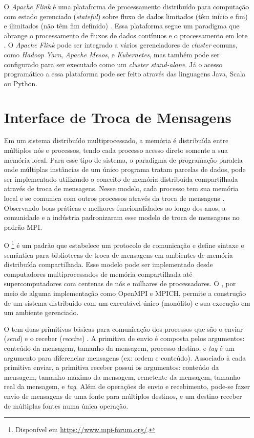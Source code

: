 O \emph{Apache Flink} é uma plataforma de processamento distribuído para
computação com estado gerenciado (\emph{stateful}) sobre fluxo de dados limitados (têm início e
fim) e ilimitados (não têm fim definido) \cite{ApacheFlink2020}.
Essa plataforma segue um paradigma que abrange o processamento de fluxos de
dados contínuos e o processamento em lote \cite{Carbone2015,Lopez2018}.
O \emph{Apache Flink} pode ser integrado a vários gerenciadores de \emph{cluster}
comuns, como \emph{Hadoop Yarn}, \emph{Apache Mesos}, e \emph{Kubernetes}, mas também pode ser
configurado para ser executado como um \emph{cluster stand-alone}.
Já o acesso programático a essa plataforma pode ser feito através das linguagens
Java, Scala ou Python.

\section{Interface de Troca de Mensagens}

Em um sistema distribuído multiprocessado, a memória é distribuída entre
múltiplos nós e processos, tendo cada processo acesso direto somente a sua memória
local.
Para esse tipo de sistema, o paradigma de programação paralela \spmd onde
múltiplas instâncias de um único programa tratam parcelas de dados, pode ser
implementado utilizando o conceito de memória distribuída compartilhada através
de troca de mensagens.
Nesse modelo, cada
processo tem sua memória local e se comunica com outros processos através da
troca de mensagens \cite{mpi-book}.
Observando boas práticas e melhores funcionalidades ao longo dos anos, a
comunidade e a indústria padronizaram esse modelo de troca de mensagens no
padrão \acf{MPI}.

O \mpi\footnote{Disponível em \url{https://www.mpi-forum.org/}.} é um padrão que
estabelece um protocolo de comunicação e define sintaxe e semântica para
bibliotecas de troca de mensagens em ambientes de memória distribuída compartilhada.
Esse modelo pode ser implementado desde computadores multiprocessados de memória
compartilhada até supercomputadores com centenas de nós e milhares de
processadores.
O \mpi, por meio de alguma
implementação como OpenMPI e MPICH, permite a construção de um sistema
distribuído com um executável único (monólito) e sua execução em um ambiente gerenciado.

O \mpi tem duas primitivas básicas para comunicação dos processos que são o
enviar (\emph{send}) e o receber (\emph{receive}) \cite{mpi-book}. A primitiva de
envio é composta pelos argumentos: conteúdo da mensagem, tamanho da mensagem,
processo destino, e \emph{tag} é um argumento para diferenciar mensagens (ex: ordem
e conteúdo).
Associado à cada primitiva enviar, a primitiva receber possui os argumentos:
conteúdo da mensagem, tamanho máximo da mensagem, remetente da mensagem, tamanho
real da mensagem, e \emph{tag}.
Além de operações de envio e recebimento, pode-se fazer
envio de mensagens de uma fonte para múltiplos destinos, e um destino receber de
múltiplas fontes numa única operação.

